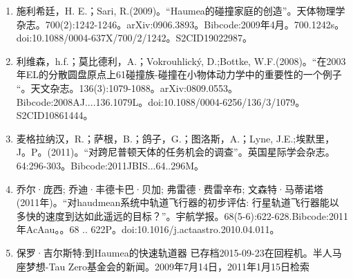 \begin{enumerate}
\item 施利希廷，H. E.；Sari, R.(2009)。“Haumea的碰撞家庭的创造”。天体物理学杂志。700(2):1242-1246。arXiv:0906.3893。Bibcode:2009年4月。700.1242s。doi:10.1088/0004-637X/700/2/1242。S2CID19022987。  
\item 利维森，h.f.；莫比德利，A.；Vokrouhlický, D.;Bottke, W.F.(2008)。“在2003年EL的分散圆盘原点上61碰撞族-碰撞在小物体动力学中的重要性的一个例子 “。天文杂志。136(3):1079-1088。arXiv:0809.0553。Bibcode:2008AJ....136.1079L。doi:10.1088/0004-6256/136/3/1079。S2CID10861444。  
\item 麦格拉纳汉，R.；萨根，B.；鸽子，G.；图洛斯，A.；Lyne, J.E.;埃默里，J。P。(2011)。“对跨尼普顿天体的任务机会的调查”。英国星际学会杂志。64:296-303。Bibcode:2011JBIS...64..296M。
\item 乔尔·庞西; 乔迪·丰德卡巴·贝加; 弗雷德·费雷辛布; 文森特·马蒂诺塔 (2011年)。“对haudmean系统中轨道飞行器的初步评估: 行星轨道飞行器能以多快的速度到达如此遥远的目标？”。宇航学报。68(5-6):622-628.Bibcode:2011年AcAau。。68 .. 622P。doi:10.1016/j.actaastro.2010.04.011。
\item 保罗·吉尔斯特:到Haumea的快速轨道器 已存档2015-09-23在回程机。半人马座梦想-Tau Zero基金会的新闻。2009年7月14日，2011年1月15日检索
\end{enumerate}
